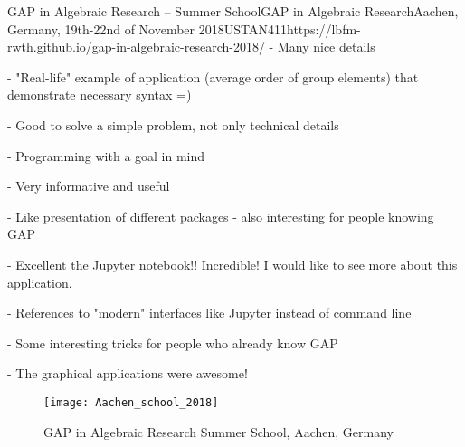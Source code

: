 \begin{event}{GAP in Algebraic Research -- Summer School}{GAP in Algebraic Research}{Aachen, Germany, 19th-22nd of November 2018}{USTAN}{41}{1}{https://lbfm-rwth.github.io/gap-in-algebraic-research-2018/}
- Many nice details

- "Real-life" example of application (average order of group elements) that demonstrate necessary syntax =)

- Good to solve a simple problem, not only technical details

- Programming with a goal in mind

- Very informative and useful

- Like presentation of different packages - also interesting for people knowing GAP

- Excellent the Jupyter notebook!! Incredible! I would like to see more about this application.

- References to "modern" interfaces like Jupyter instead of command line

- Some interesting tricks for people who already know GAP

- The graphical applications were awesome!

\begin{figure}[ht]
  \texttt{[image: Aachen\_school\_2018]}
  \caption*{GAP in Algebraic Research Summer School, Aachen, Germany}
\end{figure}

\end{event}
